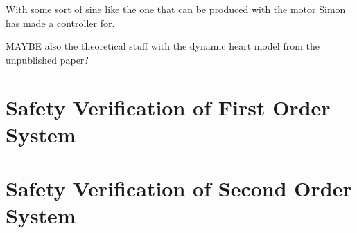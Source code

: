 With some sort of sine like the one that can be produced with the motor Simon has made a controller for.


MAYBE also the theoretical stuff with the dynamic heart model from the unpublished paper?

\section{Safety Verification of First Order System}

\section{Safety Verification of Second Order System}